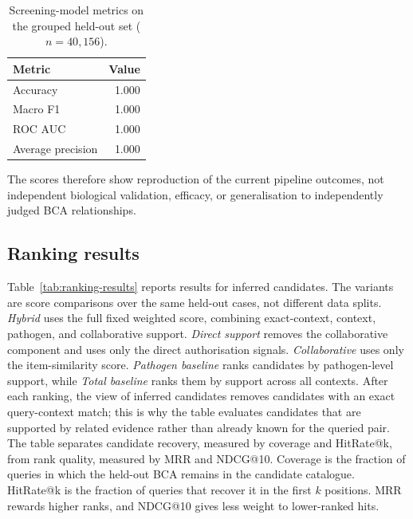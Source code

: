\begin{table}[H]
    \caption{Screening-model metrics on the grouped held-out set ($n=40{,}156$).}
    \label{tab:screening-model-metrics}
    \centering
    \small
    \begin{tabular}{lr}
        \hline
        \textbf{Metric}   & \textbf{Value} \\
        \hline
        Accuracy          & 1.000          \\
        Macro F1          & 1.000          \\
        ROC AUC           & 1.000          \\
        Average precision & 1.000          \\
        \hline
    \end{tabular}
\end{table}

The scores therefore show reproduction of the current pipeline outcomes, not independent biological validation, efficacy, or generalisation to independently judged BCA relationships.

\subsection{Ranking results}

Table~\ref{tab:ranking-results} reports results for inferred candidates. The variants are score comparisons over the same
held-out cases, not different data splits. \textit{Hybrid} uses the full fixed weighted score, combining exact-context,
context, pathogen, and collaborative support. \textit{Direct support} removes the collaborative component and uses
only the direct authorisation signals. \textit{Collaborative} uses only the item-similarity score. \textit{Pathogen
    baseline} ranks candidates by pathogen-level support, while \textit{Total baseline} ranks them by support across all
contexts. After each ranking, the view of inferred candidates removes candidates with an exact query-context match; this is why
the table evaluates candidates that are supported by related evidence rather than already known for the queried pair.
The table separates candidate recovery, measured by
coverage and HitRate@k, from rank quality, measured by MRR and NDCG@10. Coverage is the fraction of queries in
which the held-out BCA remains in the candidate catalogue. HitRate@k is the fraction of queries that recover it in
the first $k$ positions. MRR rewards higher ranks, and NDCG@10 gives less weight to lower-ranked hits.

